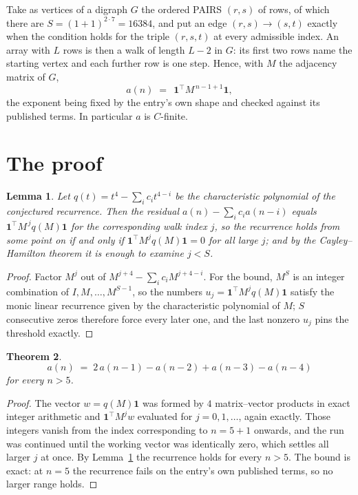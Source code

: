 \documentclass[11pt,a4paper]{article}
\theoremstyle{plain}
\newtheorem{theorem}{Theorem}
\newtheorem{lemma}[theorem]{Lemma}
\theoremstyle{definition}
\begin{document}
Take as vertices of a digraph $G$ the ordered PAIRS $(r,s)$ of rows, of which there are
$S=(1+1)^{2\cdot7}=16384$, and put an edge $(r,s)\to(s,t)$ exactly when the condition
holds for the triple $(r,s,t)$ at every admissible index. An array with $L$ rows is then a
walk of length $L-2$ in $G$: its first two rows name the starting vertex and each further
row is one step. Hence, with $M$ the adjacency matrix of $G$,
\[
a(n)\;=\;\,\mathbf{1}^{\!\top}M^{\,n-1+1}\mathbf{1},
\]
the exponent being fixed by the entry's own shape and checked against its published terms.
In particular $a$ is $C$-finite.

\section{The proof}

\begin{lemma}\label{lem:crit}
Let $q(t)=t^{4}-\sum_i c_it^{4-i}$ be the characteristic polynomial of the
conjectured recurrence. Then the residual $a(n)-\sum_ic_ia(n-i)$ equals
$\mathbf{1}^{\!\top}M^{\,j}q(M)\mathbf{1}$ for the corresponding walk index
$j$, so the recurrence holds from some point on if and only if
$\mathbf{1}^{\!\top}M^{j}q(M)\mathbf{1}=0$ for all large $j$; and by the
Cayley--Hamilton theorem it is enough to examine $j<S$.
\end{lemma}

\begin{proof}
Factor $M^{j}$ out of $M^{j+4}-\sum_ic_iM^{j+4-i}$. For the bound, $M^{S}$
is an integer combination of $I,M,\dots,M^{S-1}$, so the numbers
$u_j=\mathbf{1}^{\!\top}M^{j}q(M)\mathbf{1}$ satisfy the monic linear recurrence given by
the characteristic polynomial of $M$; $S$ consecutive zeros therefore force every later one,
and the last nonzero $u_j$ pins the threshold exactly.
\end{proof}

\begin{theorem}
\[
a(n)\;=\;2\,a(n-1) - a(n-2) + a(n-3) - a(n-4)
\]
for every $n>5$.
\end{theorem}

\begin{proof}
The vector $w=q(M)\mathbf{1}$ was formed by $4$ matrix--vector products in exact
integer arithmetic and $\mathbf{1}^{\!\top}M^{j}w$ evaluated for $j=0,1,\dots$, again
exactly. Those integers vanish from the index corresponding to $n=5+1$ onwards, and the
run was continued until the working vector was identically zero, which settles all larger $j$
at once. By Lemma~\ref{lem:crit} the recurrence holds for every $n>5$. The bound is exact: at $n=5$ the recurrence fails on the entry's own published terms, so no larger range holds.
\end{proof}
\end{document}
